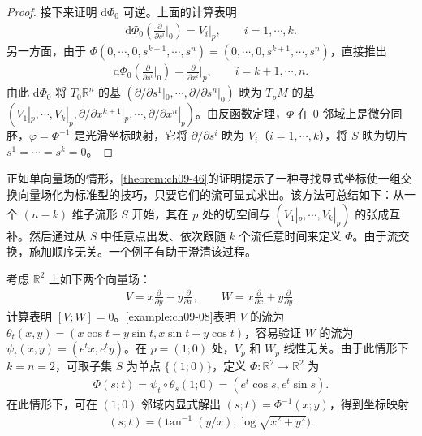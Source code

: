 \documentclass[../../main.tex]{subfiles}
\begin{document}
\begin{proof}
接下来证明 $\mathrm{d}\Phi_0$ 可逆。上面的计算表明
\begin{align*}
\mathrm{d}\Phi_0\left(\frac{\partial}{\partial s^i}\bigg|_0\right)=V_i|_p,\qquad i=1,\cdots ,k.
\end{align*}
另一方面，由于 $\Phi(0,\cdots ,0,s^{k+1},\cdots ,s^n)=(0,\cdots ,0,s^{k+1},\cdots ,s^n)$，直接推出
\begin{align*}
\mathrm{d}\Phi_0\left(\frac{\partial}{\partial s^i}\bigg|_0\right)=\frac{\partial}{\partial x^i}\bigg|_p,\qquad i=k+1,\cdots ,n.
\end{align*}
由此 $\mathrm{d}\Phi_0$ 将 $T_0\mathbb{R}^n$ 的基 $(\partial/\partial s^1|_0,\cdots ,\partial/\partial s^n|_0)$ 映为 $T_pM$ 的基 $(V_1|_p,\cdots ,V_k|_p,\partial/\partial x^{k+1}|_p,\cdots ,\partial/\partial x^n|_p)$。由反函数定理，$\Phi$ 在 $0$ 邻域上是微分同胚，$\varphi=\Phi^{-1}$ 是光滑坐标映射，它将 $\partial/\partial s^i$ 映为 $V_i$（$i=1,\cdots ,k$），将 $S$ 映为切片 $s^1=\cdots=s^k=0$。
\end{proof}

正如单向量场的情形，\cref{theorem:ch09-46}的证明提示了一种寻找显式坐标使一组交换向量场化为标准型的技巧，只要它们的流可显式求出。该方法可总结如下：从一个 $(n-k)$ 维子流形 $S$ 开始，其在 $p$ 处的切空间与 $(V_1|_p,\cdots ,V_k|_p)$ 的张成互补。然后通过从 $S$ 中任意点出发、依次跟随 $k$ 个流任意时间来定义 $\Phi$。由于流交换，施加顺序无关。一个例子有助于澄清该过程。

\begin{example}\label{example:ch09-47}
考虑 $\mathbb{R}^2$ 上如下两个向量场：
\begin{align*}
V=x\frac{\partial}{\partial y}-y\frac{\partial}{\partial x},\qquad W=x\frac{\partial}{\partial x}+y\frac{\partial}{\partial y}.
\end{align*}
计算表明 $[V;W]=0$。\cref{example:ch09-08}表明 $V$ 的流为 $\theta_t(x,y)=(x\cos t-y\sin t,x\sin t+y\cos t)$，容易验证 $W$ 的流为 $\psi_t(x,y)=(e^t x,e^t y)$。在 $p=(1;0)$ 处，$V_p$ 和 $W_p$ 线性无关。由于此情形下 $k=n=2$，可取子集 $S$ 为单点 $\{(1;0)\}$，定义 $\Phi\colon\mathbb{R}^2\to\mathbb{R}^2$ 为
\begin{align*}
\Phi(s;t)=\psi_t\circ\theta_s(1;0)=(e^t\cos s,e^t\sin s).
\end{align*}
在此情形下，可在 $(1;0)$ 邻域内显式解出 $(s;t)=\Phi^{-1}(x;y)$，得到坐标映射
\begin{align*}
(s;t)=\bigl(\tan^{-1}(y/x),\log\sqrt{x^2+y^2}\bigr).
\end{align*}
\end{example}
\end{document}
